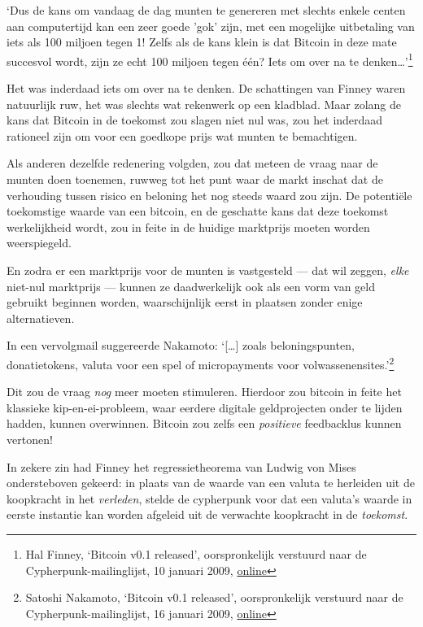 \documentclass[
  a5paper,
  smalldemyvopaper,11pt,twoside,onecolumn,openright,extrafontsizes]{memoir}
\begin{document}
`Dus de kans om vandaag de dag munten te genereren met slechts enkele
centen aan computertijd kan een zeer goede 'gok' zijn, met een mogelijke
uitbetaling van iets als 100 miljoen tegen 1! Zelfs als de kans klein is
dat Bitcoin in deze mate succesvol wordt, zijn ze echt 100 miljoen tegen
één? Iets om over na te denken\ldots'\footnote{Hal Finney, `Bitcoin v0.1
  released', oorspronkelijk verstuurd naar de Cypherpunk-mailinglijst,
  10 januari 2009,
  \href{https://www.metzdowd.com/pipermail/cryptography/2009-January/015004.html}{online}}

Het was inderdaad iets om over na te denken. De schattingen van Finney
waren natuurlijk ruw, het was slechts wat rekenwerk op een kladblad.
Maar zolang de kans dat Bitcoin in de toekomst zou slagen niet nul was,
zou het inderdaad rationeel zijn om voor een goedkope prijs wat munten
te bemachtigen.

Als anderen dezelfde redenering volgden, zou dat meteen de vraag naar de
munten doen toenemen, ruwweg tot het punt waar de markt inschat dat de
verhouding tussen risico en beloning het nog steeds waard zou zijn. De
potentiële toekomstige waarde van een bitcoin, en de geschatte kans dat
deze toekomst werkelijkheid wordt, zou in feite in de huidige marktprijs
moeten worden weerspiegeld.

En zodra er een marktprijs voor de munten is vastgesteld --- dat wil
zeggen, \emph{elke} niet-nul marktprijs --- kunnen ze daadwerkelijk ook
als een vorm van geld gebruikt beginnen worden, waarschijnlijk eerst in
plaatsen zonder enige alternatieven.

In een vervolgmail suggereerde Nakamoto: `{[}\ldots{]} zoals
beloningspunten, donatietokens, valuta voor een spel of micropayments
voor volwassenensites.'\footnote{Satoshi Nakamoto, `Bitcoin v0.1
  released', oorspronkelijk verstuurd naar de Cypherpunk-mailinglijst,
  16 januari 2009,
  \href{https://www.metzdowd.com/pipermail/cryptography/2009-January/015014.html}{online}}

Dit zou de vraag \emph{nog} meer moeten stimuleren. Hierdoor zou bitcoin
in feite het klassieke kip-en-ei-probleem, waar eerdere digitale
geldprojecten onder te lijden hadden, kunnen overwinnen. Bitcoin zou
zelfs een \emph{positieve} feedbacklus kunnen vertonen!

In zekere zin had Finney het regressietheorema van Ludwig von Mises
ondersteboven gekeerd: in plaats van de waarde van een valuta te
herleiden uit de koopkracht in het \emph{verleden}, stelde de cypherpunk
voor dat een valuta's waarde in eerste instantie kan worden afgeleid uit
de verwachte koopkracht in de \emph{toekomst}.
\end{document}
